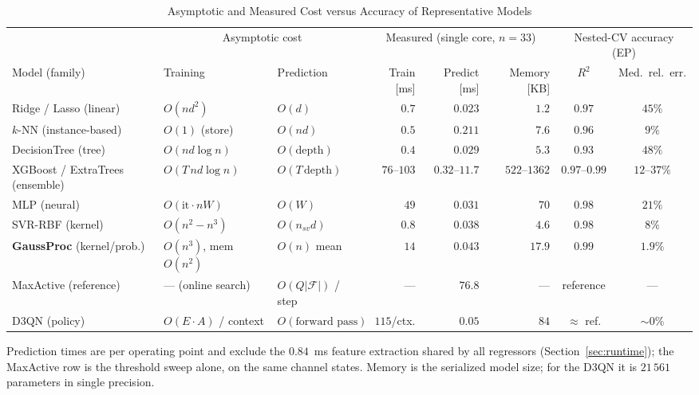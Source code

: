 \documentclass[journal]{IEEEtran}
\begin{document}
\begin{table}[!tp]
\centering
\caption{Asymptotic and Measured Cost versus Accuracy of Representative Models}
\label{tab:complexity}
\footnotesize
\setlength{\tabcolsep}{5pt}
\renewcommand{\arraystretch}{1.2}
\begin{tabular}{@{}l l l r r r c c@{}}
\toprule
& \multicolumn{2}{c}{Asymptotic cost} & \multicolumn{3}{c}{Measured (single core, $n=33$)} &
  \multicolumn{2}{c}{Nested-CV accuracy (EP)}\\
\cmidrule(lr){2-3}\cmidrule(lr){4-6}\cmidrule(lr){7-8}
Model (family) & Training & Prediction & Train [ms] & Predict [ms] & Memory [KB] & $R^2$ & Med.\ rel.\ err.\\
\midrule
Ridge / Lasso (linear)            & $O(nd^2)$              & $O(d)$                    & $0.7$        & $0.023$          & $1.2$          & $0.97$          & $45\%$\\
$k$-NN (instance-based)           & $O(1)$ (store)         & $O(nd)$                   & $0.5$        & $0.211$          & $7.6$          & $0.96$          & $9\%$\\
DecisionTree (tree)               & $O(nd\log n)$          & $O(\text{depth})$         & $0.4$        & $0.029$          & $5.3$          & $0.93$          & $48\%$\\
XGBoost / ExtraTrees (ensemble)   & $O(T\,nd\log n)$       & $O(T\,\text{depth})$      & $76$--$103$  & $0.32$--$11.7$   & $522$--$1362$  & $0.97$--$0.99$  & $12$--$37\%$\\
MLP (neural)                      & $O(\text{it}\cdot nW)$ & $O(W)$                    & $49$         & $0.031$          & $70$           & $0.98$          & $21\%$\\
SVR-RBF (kernel)                  & $O(n^2\!-\!n^3)$       & $O(n_{sv}d)$              & $0.8$        & $0.038$          & $4.6$          & $0.98$          & $8\%$\\
\textbf{GaussProc} (kernel/prob.) & $O(n^3)$, mem $O(n^2)$ & $O(n)$ mean               & $14$         & $\mathbf{0.043}$ & $\mathbf{17.9}$ & $\mathbf{0.99}$ & $\mathbf{1.9\%}$\\
\midrule
MaxActive (reference)             & --- (online search)    & $O(Q|\mathcal{F}|)$ / step & ---         & $\mathbf{76.8}$  & ---            & reference       & ---\\
D3QN (policy)                     & $O(E\cdot A)$ / context & $O(\text{forward pass})$  & $115$/ctx.  & $0.05$           & $84$           & $\approx$ ref.  & $\sim\!0\%$\\
\bottomrule
\end{tabular}
\vspace{2pt}
\parbox{0.97\textwidth}{\footnotesize Prediction times are per operating point and exclude
the $0.84$~ms feature extraction shared by all regressors (Section~\ref{sec:runtime}); the
MaxActive row is the threshold sweep alone, on the same channel states. Memory is the
serialized model size; for the D3QN it is $21\,561$ parameters in single precision.}
\end{table}
\end{document}
